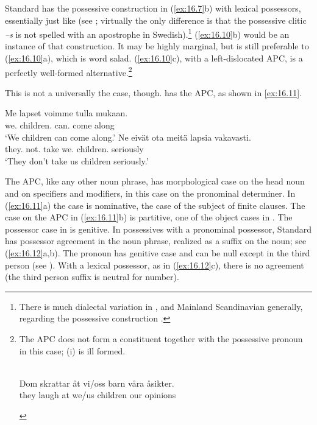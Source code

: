 \documentclass[output=paper]{langsci/langscibook}
\begin{document}
Standard  has the possessive construction in (\ref{ex:16.7}b) with
lexical possessors, essentially just like  (see
\citealt{Delsing1998,Julien2005}; virtually the only difference is that the possessive clitic
\emph{–s} is not spelled with an apostrophe in Swedish).\footnote{There is much
dialectal variation in , and Mainland Scandinavian generally, regarding
the possessive construction
\parencite{HolmbergSandstrom1996,Delsing1998,Julien2005}.}
(\ref{ex:16.10}b) would be an instance of that construction. It may be
highly marginal, but is still preferable to (\ref{ex:16.10}a), which is
word salad. (\ref{ex:16.10}c), with a left-dislocated
\gls{APC}, is a perfectly well-formed
alternative.\footnote{The \gls{APC} does
    not form a constituent together with the possessive pronoun in this case;
    (i) is ill formed.

\begin{exe}
    \\
	\gll \llap{*}Dom skrattar åt vi/oss barn våra åsikter.\\
         they laugh at we/us children our opinions\\
\end{exe}}

This is not a universally the case, though.  has the \gls{APC}, as shown in
\eqref{ex:16.11}.

\ea
    \label{ex:16.11}
	\ea
		\gll Me lapset                      voimme  tulla mukaan. \\
			we.\Nom{} children.\Nom{} can.\Fpl{} come along\\
		\glt    `We children can come along.'
	\ex
		\gll Ne  eivät      ota  meitä    lapsia         vakavasti.\\
			they.\Nom{} not.\Tpl{}  take we.\Part{} children.\Part{} seriously\\
		\glt    `They don’t take us children seriously.'
	\z
\z

The  \gls{APC}, like any other noun
phrase, has morphological case on the head noun and on specifiers and
modifiers, in this case on the pronominal determiner. In (\ref{ex:16.11}a)
the case is nominative, the case of the subject of finite
clauses. The case on the \gls{APC} in
(\ref{ex:16.11}b) is partitive, one of the object cases in . The
possessor case in  is genitive.  In possessives with a pronominal
possessor, Standard  has possessor agreement in the noun phrase,
realized as a suffix on the noun; see (\ref{ex:16.12}a,b).  The pronoun has
genitive case and can be null except in the third person (see
\citealt{BratticoHuhmarniemi2015}). With a lexical possessor, as in
(\ref{ex:16.12}c), there is no agreement (the third person suffix is
neutral for number).
\end{document}
